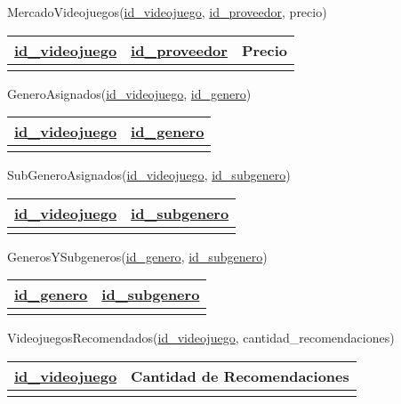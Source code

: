 \documentclass[12pt]{article}
\begin{document}
\noindent MercadoVideojuegos(\underline{id\_videojuego}, \underline{id\_proveedor}, precio)
\begin{table}[ht!]
    \centering
    \begin{tabular}{|l|l|l|}
    \hline
    \underline{id\_videojuego} & \underline{id\_proveedor} & Precio \\ \hline
       &        &            \\ \hline
    \end{tabular}
\end{table}

\noindent GeneroAsignados(\underline{id\_videojuego}, \underline{id\_genero})
\begin{table}[ht!]
    \centering
    \begin{tabular}{|l|l|}
    \hline
    \underline{id\_videojuego} & \underline{id\_genero} \\ \hline
       &        \\ \hline
    \end{tabular}
\end{table}

\noindent SubGeneroAsignados(\underline{id\_videojuego}, \underline{id\_subgenero})
\begin{table}[ht!]
    \centering
    \begin{tabular}{|l|l|}
    \hline
    \underline{id\_videojuego} & \underline{id\_subgenero} \\ \hline
       &        \\ \hline
    \end{tabular}
\end{table}

\noindent GenerosYSubgeneros(\underline{id\_genero}, \underline{id\_subgenero})
\begin{table}[ht!]
    \centering
    \begin{tabular}{|l|l|}
    \hline
    \underline{id\_genero} & \underline{id\_subgenero} \\ \hline
       &        \\ \hline
    \end{tabular}
\end{table}

\noindent VideojuegosRecomendados(\underline{id\_videojuego}, cantidad\_recomendaciones)
\begin{table}[ht!]
    \centering
    \begin{tabular}{|l|l|}
    \hline
    \underline{id\_videojuego} & Cantidad de Recomendaciones \\ \hline
       &        \\ \hline
    \end{tabular}
\end{table}
\end{document}
